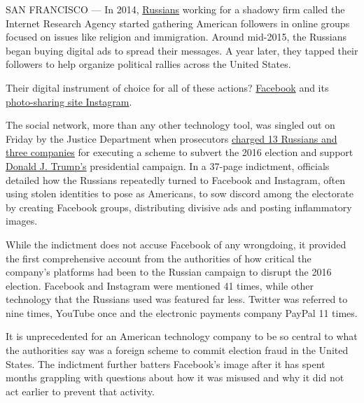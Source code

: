 SAN FRANCISCO --- In 2014,
\href{https://www.nytimes3xbfgragh.onion/2020/09/01/technology/facebook-russia-disinformation-election.html}{Russians}
working for a shadowy firm called the Internet Research Agency started
gathering American followers in online groups focused on issues like
religion and immigration. Around mid-2015, the Russians began buying
digital ads to spread their messages. A year later, they tapped their
followers to help organize political rallies across the United States.

Their digital instrument of choice for all of these actions?
\href{https://www.nytimes3xbfgragh.onion/2020/09/01/technology/facebook-russia-disinformation-election.html}{Facebook}
and its
\href{https://www.nytimes3xbfgragh.onion/2017/12/17/technology/instagram-russian-trolls.html}{photo-sharing
site Instagram}.

The social network, more than any other technology tool, was singled out
on Friday by the Justice Department when prosecutors
\href{https://www.nytimes3xbfgragh.onion/2018/02/16/us/politics/russians-indicted-mueller-election-interference.html?hp\&action=click\&pgtype=Homepage\&clickSource=story-heading\&module=a-lede-package-region\&region=top-news\&WT.nav=top-news}{charged
13 Russians and three companies} for executing a scheme to subvert the
2016 election and support
\href{https://www.nytimes3xbfgragh.onion/2020/09/01/technology/facebook-russia-disinformation-election.html}{Donald
J. Trump's} presidential campaign. In a 37-page indictment, officials
detailed how the Russians repeatedly turned to Facebook and Instagram,
often using stolen identities to pose as Americans, to sow discord among
the electorate by creating Facebook groups, distributing divisive ads
and posting inflammatory images.

While the indictment does not accuse Facebook of any wrongdoing, it
provided the first comprehensive account from the authorities of how
critical the company's platforms had been to the Russian campaign to
disrupt the 2016 election. Facebook and Instagram were mentioned 41
times, while other technology that the Russians used was featured far
less. Twitter was referred to nine times, YouTube once and the
electronic payments company PayPal 11 times.

It is unprecedented for an American technology company to be so central
to what the authorities say was a foreign scheme to commit election
fraud in the United States. The indictment further batters Facebook's
image after it has spent months grappling with questions about how it
was misused and why it did not act earlier to prevent that activity.


